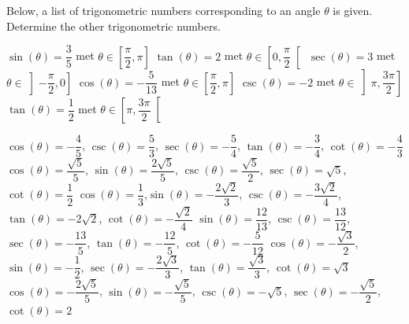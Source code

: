 \begin{Exercise} Below, a list of trigonometric numbers corresponding to an angle $\theta$ is given. Determine the other trigonometric numbers. %
	\begin{multicols}{2}
	\Question[difficulty = 1] $\sin (\theta) = \dfrac{3}{5}$\quad\;\hspace{0.05cm} met\;\; $\theta\in \left[\dfrac{\pi}{2},\pi\right]$
	\Question[difficulty = 1] $\tan (\theta) = 2$\quad\;\hspace{0.04cm} met\;\; $\theta\in \left[0,\dfrac{\pi}{2}\right[$
	\Question[difficulty = 1] $\sec (\theta)= 3$\quad\; met\;\; $\theta\in \left]-\dfrac{\pi}{2},0\right]$
	\Question[difficulty = 1] $\cos (\theta) = -\dfrac{5}{13}$\quad\; met\;\; $\theta\in \left[\dfrac{\pi}{2},\pi\right]$
	\Question[difficulty = 1] $\csc (\theta) = -2$\quad\;\hspace{0.246cm}  met\;\; $\theta\in \left]\pi,\dfrac{3\pi}{2}\right]$
	\Question[difficulty = 1] $\tan (\theta) = \dfrac{1}{2}$\quad\;\hspace{0.486cm}  met\;\; $\theta\in \left[\pi,\dfrac{3\pi}{2}\right[$
	\EndCurrentQuestion
	\end{multicols}

\end{Exercise}

\begin{Answer}\phantom{}
    
	\Question $\cos (\theta) = -\dfrac{4}{5}$, \quad $\csc(\theta) = \dfrac{5}{3}$, \quad $\sec(\theta) = -\dfrac{5}{4}$, \quad $\tan (\theta) =- \dfrac{3}{4}$, \quad $\cot (\theta) = -\dfrac{4}{3}$
	\Question $\cos (\theta) = \dfrac{\sqrt{5}}{5}$, \quad $\sin (\theta) =  \dfrac{2\sqrt{5}}{5}$, \quad $\csc(\theta) = \dfrac{\sqrt{5}}{2}$, \quad $\sec(\theta) = \sqrt{5}$, \quad $\cot (\theta) = \dfrac{1}{2}$
	\Question $\cos (\theta) = \dfrac{1}{3}$,\quad $\sin (\theta) = -\dfrac{2\sqrt{2}}{3}$, \quad $\csc(\theta) = -\dfrac{3 \sqrt{2}}{4}$, \quad $\tan (\theta) = -2\sqrt{2}$, \quad $\cot(\theta) = -\dfrac{\sqrt{2}}{4}$
	\Question  $\sin (\theta) = \dfrac{12}{13}$, \quad $\csc(\theta) = \dfrac{13}{12}$, \quad $\sec(\theta) = -\dfrac{13}{5}$, \quad $\tan (\theta) = -\dfrac{12}{5}$, \quad $\cot (\theta) = -\dfrac{5}{12}$
	\Question $\cos (\theta) = -\dfrac{\sqrt{3}}{2}$, \quad $\sin (\theta) = -\dfrac{1}{2}$, \quad $\sec(\theta) = -\dfrac{2\sqrt{3}}{3}$, \quad $\tan (\theta) = \dfrac{\sqrt{3}}{3}$, \quad $\cot (\theta) = \sqrt{3}$
	\Question $\cos (\theta) = -\dfrac{2\sqrt{5}}{5}$, \quad $\sin (\theta) =-  \dfrac{\sqrt{5}}{5}$, \quad $\csc(\theta) = -\sqrt{5}$, \quad $\sec(\theta) = - \dfrac{\sqrt{5}}{2}$, \quad $\cot (\theta) = 2$
\end{Answer}
	


